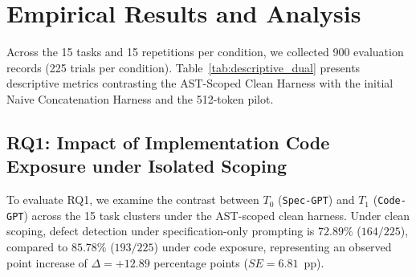 \documentclass[11pt,a4paper]{article}
\begin{document}
\section{Empirical Results and Analysis}
\label{sec:results}

Across the 15 tasks and 15 repetitions per condition, we collected 900 evaluation records (225 trials per condition). Table~\ref{tab:descriptive_dual} presents descriptive metrics contrasting the AST-Scoped Clean Harness with the initial Naive Concatenation Harness and the 512-token pilot.

\begin{table}[ht]
\centering
\caption{Descriptive Evaluation Statistics Across Experimental Conditions ($N=225$ Trials per Condition, 900 Total). Primary Dataset: 2048 Tokens; Pilot Dataset: 512 Tokens.}
\label{tab:descriptive_dual}
\end{table}

\subsection{RQ1: Impact of Implementation Code Exposure under Isolated Scoping}
To evaluate RQ1, we examine the contrast between $T_0$ (\texttt{Spec-GPT}) and $T_1$ (\texttt{Code-GPT}) across the 15 task clusters under the AST-scoped clean harness.
Under clean scoping, defect detection under specification-only prompting is $72.89\%$ ($164/225$), compared to $85.78\%$ ($193/225$) under code exposure, representing an observed point increase of $\Delta = +12.89$ percentage points ($SE = 6.81$~pp).
\end{document}
